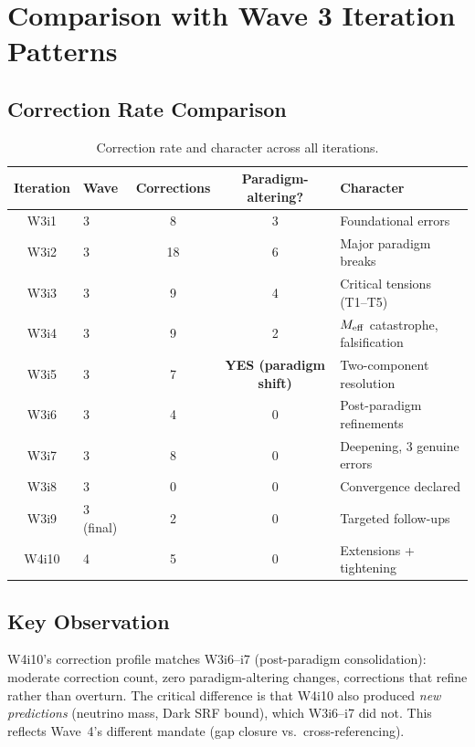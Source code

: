 \documentclass[11pt]{article}
\begin{document}
\section{Comparison with Wave 3 Iteration Patterns}
\label{sec:w3-comparison}

\subsection{Correction Rate Comparison}

\begin{table}[H]
\centering
\caption{Correction rate and character across all iterations.}
\label{tab:rate-comparison}
\begin{tabular}{clccl}
\toprule
\textbf{Iteration} & \textbf{Wave} & \textbf{Corrections} & \textbf{Paradigm-altering?} & \textbf{Character} \\
\midrule
W3i1 & 3 & 8 & 3 & Foundational errors \\
W3i2 & 3 & 18 & 6 & Major paradigm breaks \\
W3i3 & 3 & 9 & 4 & Critical tensions (T1--T5) \\
W3i4 & 3 & 9 & 2 & $M_{\rm eff}$ catastrophe, falsification \\
W3i5 & 3 & 7 & \textbf{YES (paradigm shift)} & Two-component resolution \\
W3i6 & 3 & 4 & 0 & Post-paradigm refinements \\
W3i7 & 3 & 8 & 0 & Deepening, 3 genuine errors \\
W3i8 & 3 & 0 & 0 & Convergence declared \\
W3i9 & 3 (final) & 2 & 0 & Targeted follow-ups \\
\midrule
W4i10 & 4 & 5 & 0 & Extensions + tightening \\
\bottomrule
\end{tabular}
\end{table}

\subsection{Key Observation}

W4i10's correction profile matches W3i6--i7 (post-paradigm consolidation):
moderate correction count, zero paradigm-altering changes, corrections
that refine rather than overturn. The critical difference is that W4i10
also produced \emph{new predictions} (neutrino mass, Dark SRF bound),
which W3i6--i7 did not. This reflects Wave~4's different mandate
(gap closure vs.\ cross-referencing).
\end{document}
